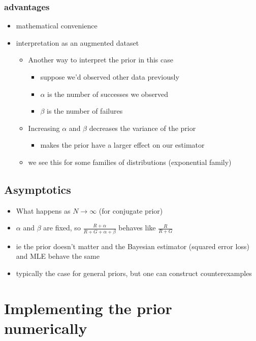 \documentclass[11pt]{article}
\begin{document}
\subsubsection{advantages}
\label{sec-2-2-1}

\begin{itemize}
\item mathematical convenience
\item interpretation as an augmented dataset
\begin{itemize}
\item Another way to interpret the prior in this case
\begin{itemize}
\item suppose we'd observed other data previously
\item $\alpha$ is the number of successes we observed
\item $\beta$ is the number of failures
\end{itemize}
\item Increasing $\alpha$ and $\beta$ decreases the variance of the prior
\begin{itemize}
\item makes the prior have a larger effect on our estimator
\end{itemize}
\item we see this for some families of distributions (exponential family)
\end{itemize}
\end{itemize}
\subsection{Asymptotics}
\label{sec-2-3}

\begin{itemize}
\item What happens as $N \to \infty$ (for conjugate prior)
\item $\alpha$ and $\beta$ are fixed, so $\frac{R + \alpha}{R + G +
       \alpha + \beta}$ behaves like $\frac{R}{R+G}$
\item ie the prior doesn't matter and the Bayesian estimator
       (squared error loss) and MLE behave the same
\item typically the case for general priors, but one can construct
       counterexamples
\end{itemize}
\section{Implementing the prior numerically}
\label{sec-3}
\end{document}
